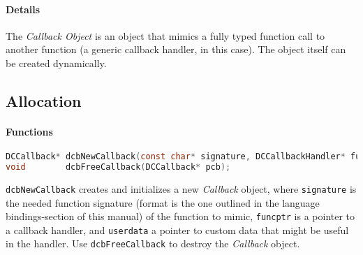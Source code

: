 \paragraph{Details}
The \emph{Callback Object} is an object that mimics a fully typed function
call to another function (a generic callback handler, in this case). The
object itself can be created dynamically.

\subsection{Allocation}

\paragraph{Functions}

\begin{lstlisting}[language=c]
DCCallback* dcbNewCallback(const char* signature, DCCallbackHandler* funcptr, void* userdata);
void        dcbFreeCallback(DCCallback* pcb);
\end{lstlisting}

\lstinline{dcbNewCallback} creates and initializes a new \emph{Callback} object,
where \lstinline{signature} is the needed function signature (format is the
one outlined in the language bindings-section of this manual) of the function
to mimic, \lstinline{funcptr} is a pointer to a callback handler, and
\lstinline{userdata} a pointer to custom data that might be useful in the handler.
Use \lstinline{dcbFreeCallback} to destroy the \emph{Callback} object.

